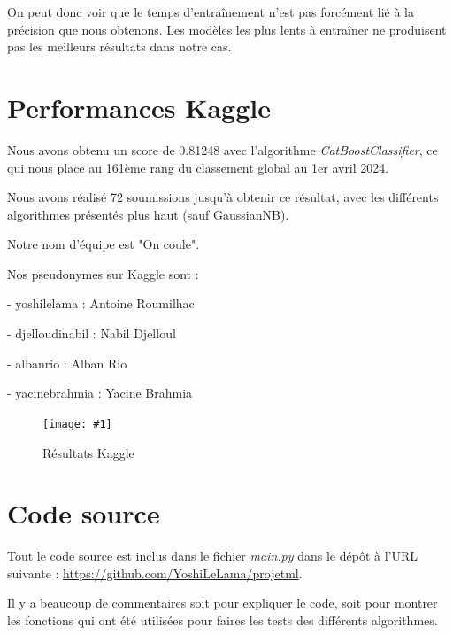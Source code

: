 \documentclass[a4paper]{article}
\newcommand{\illustration}[3]{
    \begin{figure}[h!]
        \centering
        \texttt{[image: \#1]}
        \caption{#2}
    \end{figure}
}
\begin{document}
    On peut donc voir que le temps d'entraînement n'est pas forcément lié à la précision que nous obtenons.
    Les modèles les plus lents à entraîner ne produisent pas les meilleurs résultats dans notre cas.

    \newpage

    \section{Performances Kaggle}

    Nous avons obtenu un score de 0.81248 avec l'algorithme {\it CatBoostClassifier}, ce qui nous place au 161ème rang du classement global au 1er avril 2024.

    Nous avons réalisé 72 soumissions jusqu'à obtenir ce résultat, avec les différents algorithmes présentés plus haut (sauf GaussianNB).

    Notre nom d'équipe est "On coule".

    Nos pseudonymes sur Kaggle sont :

    - yoshilelama : Antoine Roumilhac
    
    - djelloudinabil : Nabil Djelloul

    - albanrio : Alban Rio

    - yacinebrahmia : Yacine Brahmia

    \illustration{images/kaggle.png}{Résultats Kaggle}{\textwidth}

    \section{Code source}

    Tout le code source est inclus dans le fichier {\it main.py} dans le dépôt à l'URL suivante : 
    \href{https://github.com/YoshiLeLama/projetml}{https://github.com/YoshiLeLama/projetml}.

    Il y a beaucoup de commentaires soit pour expliquer le code, soit pour montrer les 
    fonctions qui ont été utilisées pour faires les tests des différents algorithmes.
\end{document}
